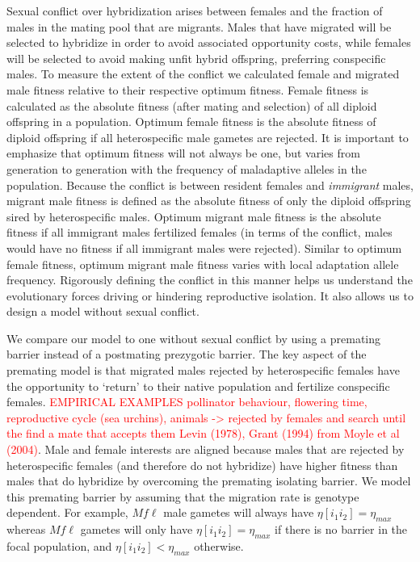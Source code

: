 \documentclass[11pt]{article}
\begin{document}
Sexual conflict over hybridization arises between females and the fraction of males in the mating pool that are migrants.  Males that have migrated will be selected to hybridize in order to avoid associated opportunity costs, while females will be selected to avoid making unfit hybrid offspring, preferring conspecific males.  To measure the extent of the conflict we calculated female and migrated male fitness relative to their respective optimum fitness.  Female fitness is calculated as the absolute fitness (after mating and selection) of all diploid offspring in a population.  Optimum female fitness is the absolute fitness of diploid offspring if all heterospecific male gametes are rejected.  It is important to emphasize that optimum fitness will not always be one, but varies from generation to generation with the frequency of maladaptive alleles in the population.  Because the conflict is between resident females and \emph{immigrant} males, migrant male fitness is defined as the absolute fitness of only the diploid offspring sired by heterospecific males.  Optimum migrant male fitness is the absolute fitness if all immigrant males fertilized females (in terms of the conflict, males would have no fitness if all immigrant males were rejected).  Similar to optimum female fitness, optimum migrant male fitness varies with local adaptation allele frequency. Rigorously defining the conflict in this manner helps us understand the evolutionary forces driving or hindering reproductive isolation. It also allows us to design a model without sexual conflict.

We compare our model to one without sexual conflict by using a premating barrier instead of a postmating prezygotic barrier.  The key aspect of the premating model is that migrated males rejected by heterospecific females have the opportunity to `return' to their native population and fertilize conspecific females.  \textcolor{red}{EMPIRICAL EXAMPLES pollinator behaviour, flowering time, reproductive cycle (sea urchins), animals -> rejected by females and search until the find a mate that accepts them \textcolor{red}{Levin (1978), Grant (1994) from Moyle et al (2004)}}. Male and female interests are aligned because males that are rejected by heterospecific females (and therefore do not hybridize) have higher fitness than males that do hybridize by overcoming the premating isolating barrier.  We model this premating barrier by assuming that the migration rate is genotype dependent.  For example, $M f \ell$ male gametes will always have $\eta[i_1 i_2] = \eta_{max}$ whereas $M f \ell$ gametes will only have $\eta[i_1 i_2] = \eta_{max}$ if there is no barrier in the focal population, and $\eta[i_1 i_2] < \eta_{max}$ otherwise.  
\end{document}
